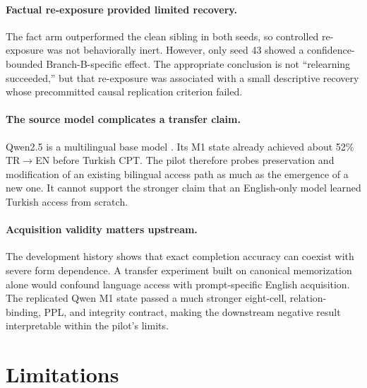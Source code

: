 \documentclass[10pt,a4paper,twocolumn]{article}
\newcommand{\mone}{M1}
\newcommand{\trtoen}{TR$\rightarrow$EN}
\begin{document}
\paragraph{Factual re-exposure provided limited recovery.}
The fact arm outperformed the clean sibling in both seeds, so controlled re-exposure was not behaviorally inert. However, only seed 43 showed a confidence-bounded Branch-B-specific effect. The appropriate conclusion is not ``relearning succeeded,'' but that re-exposure was associated with a small descriptive recovery whose precommitted causal replication criterion failed.

\paragraph{The source model complicates a transfer claim.}
Qwen2.5 is a multilingual base model \citep{qwen25modelcard}. Its \mone{} state already achieved about 52\% \trtoen{} before Turkish CPT. The pilot therefore probes preservation and modification of an existing bilingual access path as much as the emergence of a new one. It cannot support the stronger claim that an English-only model learned Turkish access from scratch.

\paragraph{Acquisition validity matters upstream.}
The development history shows that exact completion accuracy can coexist with severe form dependence. A transfer experiment built on canonical memorization alone would confound language access with prompt-specific English acquisition. The replicated Qwen \mone{} state passed a much stronger eight-cell, relation-binding, PPL, and integrity contract, making the downstream negative result interpretable within the pilot's limits.

\section{Limitations}
\end{document}
